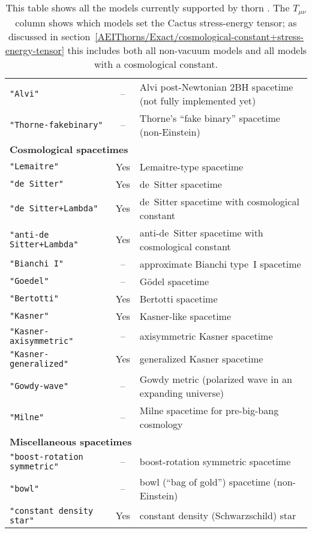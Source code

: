 \begin{table}[htbp]
\begin{center}
\begin{tabular}{@{\qquad}lcp{80mm}}
{\tt "Alvi"}
	& --	& Alvi post-Newtonian 2BH spacetime
		  (not fully implemented yet)				\\
{\tt "Thorne-fakebinary"}
	& --	& Thorne's ``fake binary'' spacetime (non-Einstein)	\\[1ex]
%
\multicolumn{3}{l}{\bf Cosmological spacetimes}				\\
{\tt "Lemaitre"}
	& Yes	& Lemaitre-type spacetime				\\
{\tt "de Sitter"}
	& Yes	& de~Sitter spacetime					\\
{\tt "de Sitter+Lambda"}
	& Yes	& de~Sitter spacetime with cosmological constant	\\
{\tt "anti-de Sitter+Lambda"}
	& Yes	& anti-de~Sitter spacetime with cosmological constant	\\
{\tt "Bianchi I"}
	& --	& approximate Bianchi type~I spacetime			\\
{\tt "Goedel"}
	& --	& G\"{o}del spacetime					\\
{\tt "Bertotti"}
	& Yes	& Bertotti spacetime					\\
{\tt "Kasner"}
	& Yes	& Kasner-like spacetime					\\
{\tt "Kasner-axisymmetric"}
	& --	& axisymmetric Kasner spacetime				\\
{\tt "Kasner-generalized"}
	& Yes	& generalized Kasner spacetime				\\
{\tt "Gowdy-wave"}
	& --	& Gowdy metric (polarized wave in an expanding universe)\\
{\tt "Milne"}
	& --	& Milne spacetime for pre-big-bang cosmology		\\[1ex]
%
\multicolumn{3}{l}{\bf Miscellaneous spacetimes}			\\
{\tt "boost-rotation symmetric"}
	& --	& boost-rotation symmetric spacetime			\\
{\tt "bowl"}
	& --	& bowl (``bag of gold'') spacetime (non-Einstein)	\\
{\tt "constant density star"}
	& Yes	& constant density (Schwarzschild) star			%
\end{tabular}
\end{center}
\caption{
	This table shows all the models currently supported by
	thorn .  The $T_{\mu\nu}$ column shows which
	models set the Cactus stress-energy tensor; as discussed in
	section~\ref{AEIThorns/Exact/cosmological-constant+stress-energy-tensor}
	this includes both all non-vacuum models and all models
	with a cosmological constant.
	}
\label{AEIThorns/Exact/tab-all-models}
\end{table}

